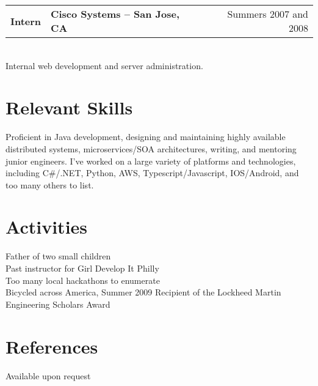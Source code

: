 \documentclass{res}
\newlength{\vsep}
\begin{document}
\begin{resume}
   \begin{tabularx}{\textwidth}{@{}>{\bf}l>{\large\bf\centering\arraybackslash}Xr@{}}
   Intern & Cisco Systems -- San Jose, CA & Summers 2007 and 2008\vspace{\vsep}\\
   \end{tabularx}\\
   Internal web development and server administration.


\section{Relevant Skills}
Proficient in Java development, designing and maintaining highly available distributed systems, microservices/SOA architectures, writing, and mentoring junior engineers.  I've worked on a large variety of platforms and technologies, including C\#/.NET, Python, AWS, Typescript/Javascript, IOS/Android, and too many others to list.
 
\section{Activities}
    Father of two small children\\
    Past instructor for Girl Develop It Philly\\
    Too many local hackathons to enumerate\\
    Bicycled across America, Summer 2009
    Recipient of the Lockheed Martin Engineering Scholars Award\\

\section{References}
    Available upon request

\end{resume}
\end{document}
